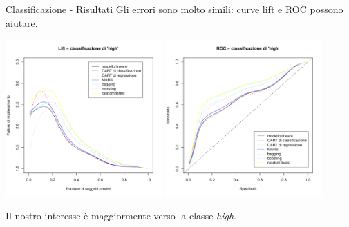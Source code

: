 \documentclass{beamer}
\begin{document}
\begin{frame}{Classificazione - Risultati}
Gli errori sono molto simili: curve lift e ROC possono aiutare.
\begin{center}
  \includegraphics[width=0.45\textwidth]{images/lift-high.pdf}
  \includegraphics[width=0.45\textwidth]{images/roc-high.pdf}
\end{center}
Il nostro interesse \`e maggiormente verso la
classe \emph{high}.
\end{frame}
\end{document}
